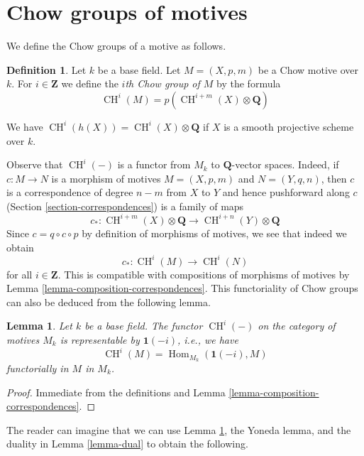 \documentclass{stacks-project}
\theoremstyle{plain}
\newtheorem{lemma}[subsection]{Lemma}
\theoremstyle{definition}
\newtheorem{definition}[subsection]{Definition}
\theoremstyle{remark}
\numberwithin{equation}{subsection}
\def\Hom{\mathop{\mathrm{Hom}}\nolimits}
\def\CH{\mathop{\mathrm{CH}}\nolimits}
\begin{document}
\section{Chow groups of motives}
\label{section-chow-groups-motives}

\noindent
We define the Chow groups of a motive as follows.

\begin{definition}
\label{definition-chow-group-motives}
Let $k$ be a base field. Let $M = (X, p, m)$ be a Chow motive over $k$.
For $i \in \mathbf{Z}$ we define the {\it $i$th Chow group of $M$}
by the formula
$$
\CH^i(M) = p\left(\CH^{i + m}(X) \otimes \mathbf{Q}\right)
$$
\end{definition}

\noindent
We have $\CH^i(h(X)) = \CH^i(X) \otimes \mathbf{Q}$
if $X$ is a smooth projective scheme over $k$.

\medskip\noindent
Observe that $\CH^i(-)$ is a functor from $M_k$ to $\mathbf{Q}$-vector spaces.
Indeed, if $c : M \to N$ is a morphism of motives
$M = (X, p, m)$ and $N = (Y, q, n)$, then $c$ is a correspondence of
degree $n - m$ from $X$ to $Y$ and hence pushforward along $c$
(Section \ref{section-correspondences}) is a family of maps
$$
c_* :
\CH^{i + m}(X) \otimes \mathbf{Q}
\longrightarrow
\CH^{i + n}(Y) \otimes \mathbf{Q}
$$
Since $c = q \circ c \circ p$ by definition of morphisms of motives,
we see that indeed we obtain
$$
c_* : \CH^i(M) \to \CH^i(N)
$$
for all $i \in \mathbf{Z}$. This is compatible with compositions of
morphisms of motives by Lemma \ref{lemma-composition-correspondences}.
This functoriality of Chow groups can also be deduced from the following
lemma.

\begin{lemma}
\label{lemma-chow-groups-representable}
Let $k$ be a base field. The functor $\CH^i(-)$ on the category
of motives $M_k$ is representable by $\mathbf{1}(-i)$, i.e., we
have
$$
\CH^i(M) = \Hom_{M_k}(\mathbf{1}(-i), M)
$$
functorially in $M$ in $M_k$.
\end{lemma}

\begin{proof}
Immediate from the definitions and
Lemma \ref{lemma-composition-correspondences}.
\end{proof}

\noindent
The reader can imagine that we can use
Lemma \ref{lemma-chow-groups-representable}, the Yoneda lemma, and
the duality in Lemma \ref{lemma-dual} to obtain the following.
\end{document}
